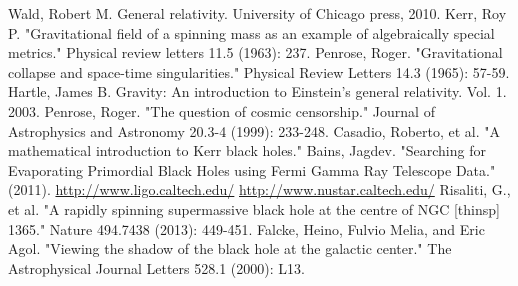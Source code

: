 \documentclass[12pt]{article}
\theoremstyle{plain}
\begin{document}
\begin{thebibliography}{50}
 Wald, Robert M. General relativity. University of Chicago press, 2010.
Kerr, Roy P. "Gravitational field of a spinning mass as an example of algebraically special metrics." Physical review letters 11.5 (1963): 237.
Penrose, Roger. "Gravitational collapse and space-time singularities." Physical Review Letters 14.3 (1965): 57-59.
 Hartle, James B. Gravity: An introduction to Einstein's general relativity. Vol. 1. 2003.
 Penrose, Roger. "The question of cosmic censorship." Journal of Astrophysics and Astronomy 20.3-4 (1999): 233-248.
 Casadio, Roberto, et al. "A mathematical introduction to Kerr black holes."
 Bains, Jagdev. "Searching for Evaporating Primordial Black Holes using Fermi Gamma Ray Telescope Data." (2011).
 \url{http://www.ligo.caltech.edu/}
 \url{http://www.nustar.caltech.edu/}
 Risaliti, G., et al. "A rapidly spinning supermassive black hole at the centre of NGC [thinsp] 1365." Nature 494.7438 (2013): 449-451.
 Falcke, Heino, Fulvio Melia, and Eric Agol. "Viewing the shadow of the black hole at the galactic center." The Astrophysical Journal Letters 528.1 (2000): L13.
\end{thebibliography}
\end{document}
